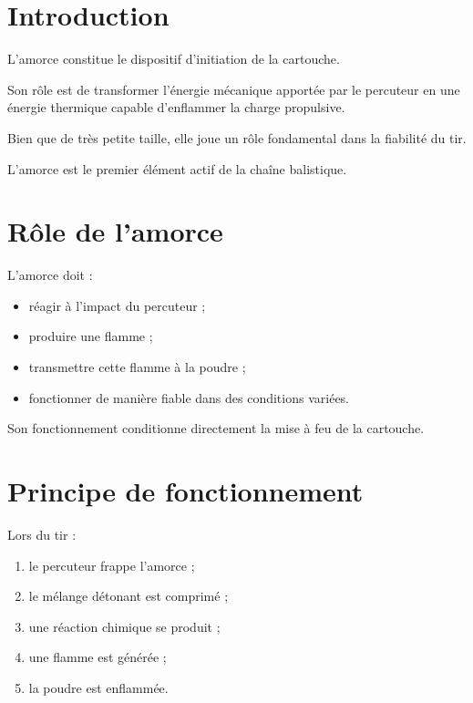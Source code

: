 
\section{Introduction}

L'amorce constitue le dispositif d'initiation de la cartouche.

Son rôle est de transformer l'énergie mécanique apportée par le percuteur en
une énergie thermique capable d'enflammer la charge propulsive.

Bien que de très petite taille, elle joue un rôle fondamental dans la
fiabilité du tir.

\begin{aretenir}

L'amorce est le premier élément actif de la chaîne balistique.

\end{aretenir}

\section{Rôle de l'amorce}

L'amorce doit :

\begin{itemize}
    \item réagir à l'impact du percuteur ;
    \item produire une flamme ;
    \item transmettre cette flamme à la poudre ;
    \item fonctionner de manière fiable dans des conditions variées.
\end{itemize}

Son fonctionnement conditionne directement la mise à feu de la cartouche.

\section{Principe de fonctionnement}

Lors du tir :

\begin{enumerate}
    \item le percuteur frappe l'amorce ;
    \item le mélange détonant est comprimé ;
    \item une réaction chimique se produit ;
    \item une flamme est générée ;
    \item la poudre est enflammée.
\end{enumerate}

